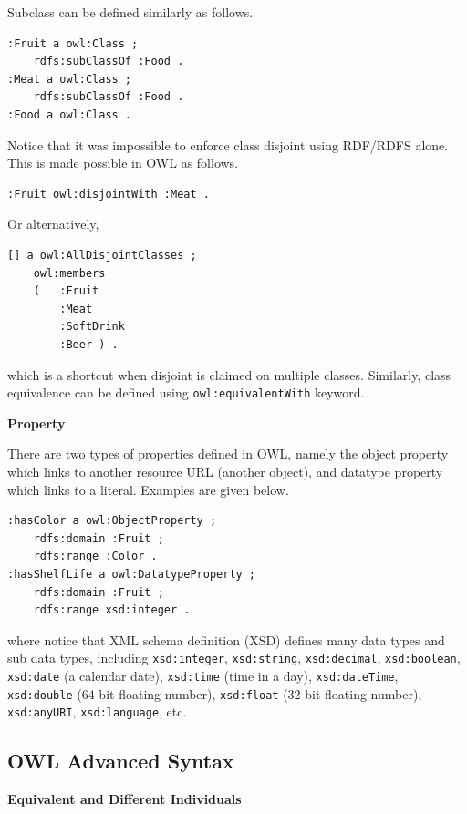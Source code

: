 Subclass can be defined similarly as follows.
\begin{lstlisting}
:Fruit a owl:Class ;
	rdfs:subClassOf :Food .
:Meat a owl:Class ;
	rdfs:subClassOf :Food .
:Food a owl:Class .
\end{lstlisting}

Notice that it was impossible to enforce class disjoint using RDF/RDFS alone. This is made possible in OWL as follows.
\begin{lstlisting}
:Fruit owl:disjointWith :Meat .
\end{lstlisting}
Or alternatively,
\begin{lstlisting}
[] a owl:AllDisjointClasses ;
	owl:members
	(	:Fruit
		:Meat
		:SoftDrink
		:Beer ) .
\end{lstlisting}
which is a shortcut when disjoint is claimed on multiple classes. Similarly, class equivalence can be defined using \verb|owl:equivalentWith| keyword.

\vspace{0.1in}
\noindent \textbf{Property}
\vspace{0.1in}

There are two types of properties defined in OWL, namely the object property which links to another resource URL (another object), and datatype property which links to a literal. Examples are given below.
\begin{lstlisting}
:hasColor a owl:ObjectProperty ;
	rdfs:domain :Fruit ;
	rdfs:range :Color .
:hasShelfLife a owl:DatatypeProperty ;
	rdfs:domain :Fruit ;
	rdfs:range xsd:integer .
\end{lstlisting}
where notice that XML schema definition (XSD) defines many data types and sub data types, including \verb|xsd:integer|, \verb|xsd:string|, \verb|xsd:decimal|, \verb|xsd:boolean|, \verb|xsd:date| (a calendar date), \verb|xsd:time| (time in a day), \verb|xsd:dateTime|, \verb|xsd:double| (64-bit floating number), \verb|xsd:float| (32-bit floating number), \verb|xsd:anyURI|, \verb|xsd:language|, etc.

\subsection{OWL Advanced Syntax}

\vspace{0.1in}
\noindent \textbf{Equivalent and Different Individuals}
\vspace{0.1in}

